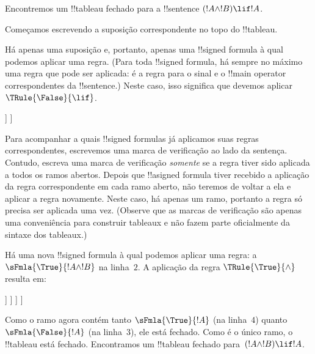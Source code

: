 \documentclass[../../../include/open-logic-section]{subfiles}
\begin{document}
      {}
      {}


\begin{ex}
Encontremos um !!{tableau} fechado para a !!{sentence} $(!A \land !B) \lif !A$.

Começamos escrevendo a suposição correspondente no topo do
!!{tableau}.
\begin{oltableau}
  [\sFmla{\False}{(\formula{A} \land \formula{B}) \lif \formula{A}},
    just = \TAss]
\end{oltableau}

Há apenas uma suposição e, portanto, apenas uma !!{signed formula} à qual
podemos aplicar uma regra. (Para toda !!{signed formula}, há sempre no
máximo uma regra que pode ser aplicada: é a regra para o sinal e o
!!{main operator} correspondentes da !!{sentence}.) Neste caso, isso
significa que devemos aplicar $\TRule{\False}{\lif}$.
\begin{oltableau}
  [\sFmla{\False}{(\formula{A} \land \formula{B}) \lif \formula{A}},
    checked, just = \TAss
    [\sFmla{\True}{\formula{A} \land \formula{B}},
      just={\TRule{\False}{\lif}[1]}
      [\sFmla{\False}{\formula{A}}, just={\TRule{\False}{\lif}[1]}]
    ]
  ]
\end{oltableau}
Para acompanhar a quais !!{signed formula}s já aplicamos suas regras
correspondentes, escrevemos uma marca de verificação ao lado da
sentença. Contudo, escreva uma marca de verificação \emph{somente} se a
regra tiver sido aplicada a todos os ramos abertos. Depois que !!a{signed formula}
tiver recebido a aplicação da regra correspondente em cada ramo aberto,
não teremos de voltar a ela e aplicar a regra novamente. Neste caso, há
apenas um ramo, portanto a regra só precisa ser aplicada uma vez. (Observe
que as marcas de verificação são apenas uma conveniência para construir
tableaux e não fazem parte oficialmente da sintaxe dos tableaux.)

Há uma nova !!{signed formula} à qual podemos aplicar uma regra: a
$\sFmla{\True}{!A \land !B}$ na linha~$2$. A aplicação da regra
$\TRule{\True}{\land}$ resulta em:
\begin{oltableau}
  [\sFmla{\False}{(\formula{A} \land \formula{B}) \lif \formula{A}},
    checked, just = \TAss
    [\sFmla{\True}{\formula{A} \land \formula{B}},
      just={\TRule{\False}{\lif}[1]}, checked
      [\sFmla{\False}{\formula{A}}, just={\TRule{\False}{\lif}[1]}
        [\sFmla{\True}{\formula{A}}, just={\TRule{\True}{\land}[2]}
          [\sFmla{\True}{\formula{B}}, just={\TRule{\True}{\land}[2]}, close
          ]
        ]
      ]
    ]
  ]
\end{oltableau}
Como o ramo agora contém tanto $\sFmla{\True}{!A}$ (na linha~$4$)
quanto $\sFmla{\False}{!A}$ (na linha~$3$), ele está fechado. Como é
o único ramo, o !!{tableau} está fechado. Encontramos
um !!{tableau} fechado para~$(!A \land !B) \lif !A$.
\end{ex}
\end{document}
